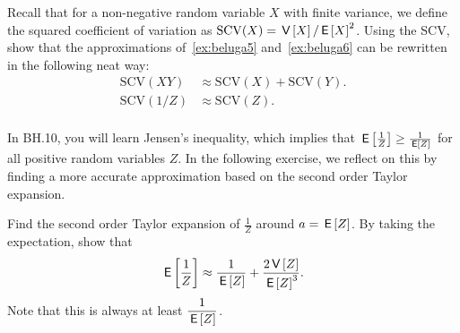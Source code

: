 \documentclass[assignments]{subfiles}
\begin{document}
\begin{exercise}
Recall that for a non-negative random variable $X$ with finite variance, we define the squared coefficient of variation as $ \mathrm{SCV}(X) = \,\mathsf{V}\left[X\right] /\,\mathsf{E}\left[X\right]^2$.
Using the SCV, show that the approximations of~\cref{ex:beluga5} and~\cref{ex:beluga6} can be rewritten in the following neat way:
\begin{align*}
\mathrm{SCV}(XY) &\approx \mathrm{SCV}(X) + \mathrm{SCV}(Y). \\
\mathrm{SCV}\left(1/Z \right) &\approx \mathrm{SCV}(Z). \\
\end{align*}
\end{exercise}


In BH.10, you will learn Jensen's inequality, which implies that $\,\mathsf{E}\left[\frac{1}{Z}\right] \geq \frac{1}{\,\mathsf{E}\left[Z\right]}$ for all positive random variables $Z$. In the following exercise, we reflect on this by finding a more accurate approximation based on the second order Taylor expansion.

\begin{exercise} Find the second order Taylor expansion of $\frac{1}{Z}$ around $a=  \,\mathsf{E}\left[Z\right]$.
By taking the expectation, show that
\begin{align*}
\,\mathsf{E}\left[\frac{1}{Z}\right] \approx \frac{1}{\,\mathsf{E}\left[Z\right]} + \frac{2\,\mathsf{V}\left[Z\right]}{\,\mathsf{E}\left[Z\right]^3}.
\end{align*}
Note that this is always at least $\dfrac{1}{\,\mathsf{E}\left[Z\right]}$.
\end{exercise}


% 
% 
\end{document}
